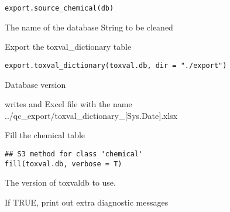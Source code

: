 \documentclass[letterpaper]{book}
\begin{document}
%
\begin{Usage}
\begin{verbatim}
export.source_chemical(db)
\end{verbatim}
\end{Usage}
%
\begin{Arguments}
\begin{ldescription}
\item[\code{db}] The name of the database String to be cleaned
\end{ldescription}
\end{Arguments}
%
\begin{Description}\relax
Export the toxval\_dictionary table
\end{Description}
%
\begin{Usage}
\begin{verbatim}
export.toxval_dictionary(toxval.db, dir = "./export")
\end{verbatim}
\end{Usage}
%
\begin{Arguments}
\begin{ldescription}
\item[\code{toxval.db}] Database version
\end{ldescription}
\end{Arguments}
%
\begin{Value}
writes and Excel file with the name
../qc\_export/toxval\_dictionary\_[Sys.Date].xlsx
\end{Value}
%
\begin{Description}\relax
Fill the chemical table
\end{Description}
%
\begin{Usage}
\begin{verbatim}
## S3 method for class 'chemical'
fill(toxval.db, verbose = T)
\end{verbatim}
\end{Usage}
%
\begin{Arguments}
\begin{ldescription}
\item[\code{toxval.db}] The version of toxvaldb to use.

\item[\code{verbose}] If TRUE, print out extra diagnostic messages
\end{ldescription}
\end{Arguments}
\end{document}
